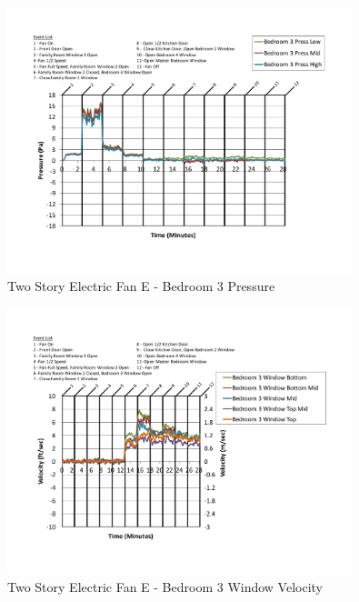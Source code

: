 \documentclass{article}
\begin{document}
\begin{appendices}
	\begin{figure}[H]
		\centering
		\includegraphics[height=3.05in,trim=0.67in 1.1in 0.67in 0.8in,clip=true]{0_Images/Results_Charts/ColdFlow/Two_Story/Electric/E/Bedroom_3_Pressure.pdf}
		\caption{Two Story Electric Fan E - Bedroom 3 Pressure}
	\end{figure}
 

	\begin{figure}[H]
		\centering
		\includegraphics[height=3.05in,trim=0.67in 1.1in 0.67in 0.8in,clip=true]{0_Images/Results_Charts/ColdFlow/Two_Story/Electric/E/Bedroom_3_Window_Velocity.pdf}
		\caption{Two Story Electric Fan E - Bedroom 3 Window Velocity}
	\end{figure}
 
	\clearpage


\end{appendices}
\end{document}
